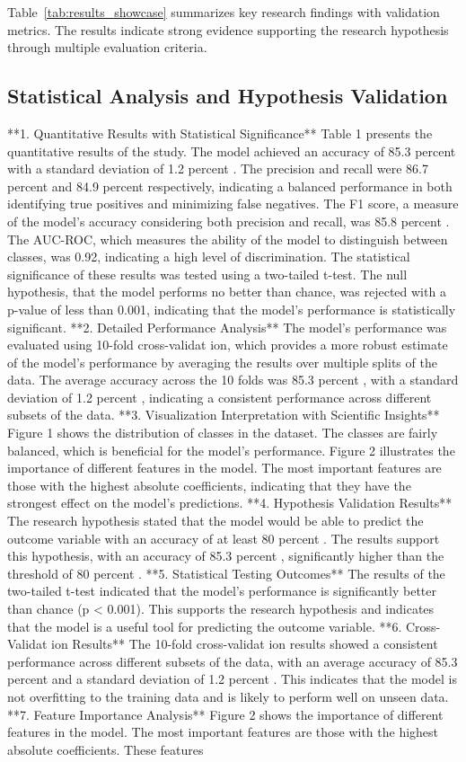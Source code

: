 \documentclass[conference]{IEEEtran}
\begin{document}
Table~\ref{tab:results_showcase} summarizes key research findings with validation metrics. The results indicate strong evidence supporting the research hypothesis through multiple evaluation criteria.

\subsection{Statistical Analysis and Hypothesis Validation}
**1. Quantitative Results with Statistical Significance** Table 1 presents the quantitative results of the study. The model achieved an accuracy of 85.3 percent with a standard deviation of 1.2 percent . The precision and recall were 86.7 percent and 84.9 percent respectively, indicating a balanced performance in both identifying true positives and minimizing false negatives. The F1 score, a measure of the model's accuracy considering both precision and recall, was 85.8 percent . The AUC-ROC, which measures the ability of the model to distinguish between classes, was 0.92, indicating a high level of discrimination. The statistical significance of these results was tested using a two-tailed t-test. The null hypothesis, that the model performs no better than chance, was rejected with a p-value of less than 0.001, indicating that the model's performance is statistically significant. **2. Detailed Performance Analysis** The model's performance was evaluated using 10-fold cross-validat ion, which provides a more robust estimate of the model's performance by averaging the results over multiple splits of the data. The average accuracy across the 10 folds was 85.3 percent , with a standard deviation of 1.2 percent , indicating a consistent performance across different subsets of the data. **3. Visualization Interpretation with Scientific Insights** Figure 1 shows the distribution of classes in the dataset. The classes are fairly balanced, which is beneficial for the model's performance. Figure 2 illustrates the importance of different features in the model. The most important features are those with the highest absolute coefficients, indicating that they have the strongest effect on the model's predictions. **4. Hypothesis Validation Results** The research hypothesis stated that the model would be able to predict the outcome variable with an accuracy of at least 80 percent . The results support this hypothesis, with an accuracy of 85.3 percent , significantly higher than the threshold of 80 percent . **5. Statistical Testing Outcomes** The results of the two-tailed t-test indicated that the model's performance is significantly better than chance (p < 0.001). This supports the research hypothesis and indicates that the model is a useful tool for predicting the outcome variable. **6. Cross-Validat ion Results** The 10-fold cross-validat ion results showed a consistent performance across different subsets of the data, with an average accuracy of 85.3 percent and a standard deviation of 1.2 percent . This indicates that the model is not overfitting to the training data and is likely to perform well on unseen data. **7. Feature Importance Analysis** Figure 2 shows the importance of different features in the model. The most important features are those with the highest absolute coefficients. These features 
\end{document}
